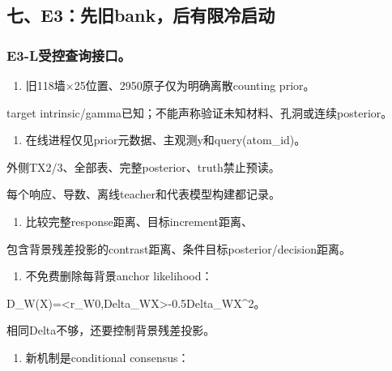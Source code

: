 \documentclass[
  10pt,
  a4paper,
]{article}
\providecommand{\tightlist}{%
  \setlength{\itemsep}{0pt}\setlength{\parskip}{0pt}}
\providecommand{\tightlist}{\setlength{\itemsep}{1pt}\setlength{\parskip}{1pt}}
\begin{document}
\hypertarget{ux4e03e3ux5148ux65e7bankux540eux6709ux9650ux51b7ux542fux52a8}{%
\subsection{七、E3：先旧bank，后有限冷启动}\label{ux4e03e3ux5148ux65e7bankux540eux6709ux9650ux51b7ux542fux52a8}}

\hypertarget{e3-lux53d7ux63a7ux67e5ux8be2ux63a5ux53e3}{%
\subsubsection{E3-L受控查询接口。}\label{e3-lux53d7ux63a7ux67e5ux8be2ux63a5ux53e3}}

\begin{enumerate}
\def\labelenumi{\arabic{enumi}.}
\tightlist
\item
  旧118墙×25位置、2950原子仅为明确离散counting prior。
\end{enumerate}

target intrinsic/gamma已知；不能声称验证未知材料、孔洞或连续posterior。

\begin{enumerate}
\def\labelenumi{\arabic{enumi}.}
\setcounter{enumi}{1}
\tightlist
\item
  在线进程仅见prior元数据、主观测y和query(atom\_id)。
\end{enumerate}

外侧TX2/3、全部表、完整posterior、truth禁止预读。

每个响应、导数、离线teacher和代表模型构建都记录。

\begin{enumerate}
\def\labelenumi{\arabic{enumi}.}
\setcounter{enumi}{2}
\tightlist
\item
  比较完整response距离、目标increment距离、
\end{enumerate}

包含背景残差投影的contrast距离、条件目标posterior/decision距离。

\begin{enumerate}
\def\labelenumi{\arabic{enumi}.}
\setcounter{enumi}{3}
\tightlist
\item
  不免费删除每背景anchor likelihood：
\end{enumerate}

D\_W(X)=\textless r\_W0,Delta\_WX\textgreater-0.5\textbar\textbar Delta\_WX\textbar\textbar\^{}2。

相同Delta不够，还要控制背景残差投影。

\begin{enumerate}
\def\labelenumi{\arabic{enumi}.}
\setcounter{enumi}{4}
\tightlist
\item
  新机制是conditional consensus：
\end{enumerate}
\end{document}
